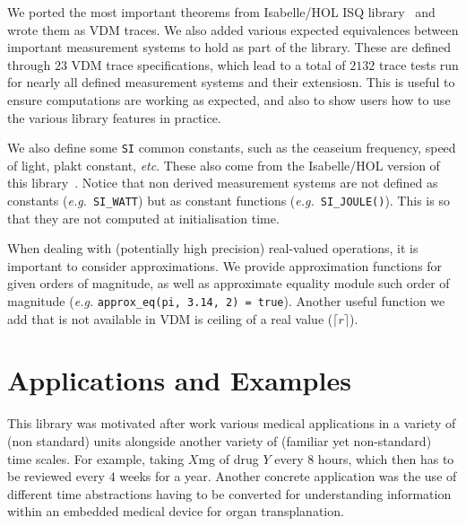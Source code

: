 \documentclass[runningheads,a4paper]{llncs}
\begin{document}
We ported the most important theorems from Isabelle/HOL ISQ library~\cite{Physical_Quantities-AFP} and wrote them as VDM traces. We also added various expected equivalences between important measurement systems to hold as part of the library. These are defined through \(23\) VDM trace specifications, which lead to a total of \(2132\) trace tests run for nearly all defined measurement systems and their extensiosn. This is useful to ensure computations are working as expected, and also to show users how to use the various library features in practice. 

We also define some \texttt{SI} common constants, such as the ceaseium frequency, speed of light, plakt constant, \textit{etc}. These also come from the Isabelle/HOL version of this library~\cite{Physical_Quantities-AFP}. Notice that non derived measurement systems are not defined as constants (\textit{e.g.}~\texttt{SI\_WATT}) but as constant functions (\textit{e.g.}~\texttt{SI\_JOULE()}). This is so that they are not computed at initialisation time.  

When dealing with (potentially high precision) real-valued operations, it is important to consider approximations. We provide approximation functions for given orders of magnitude, as well as approximate equality module such order of magnitude (\textit{e.g.} \texttt{approx\_eq(pi, 3.14, 2) = true}). Another useful function we add that is not available in VDM is ceiling of a real value (\(\lceil r \rceil\)). 

\section{Applications and Examples}\label{sec:Examples}

This library was motivated after work various medical applications in a variety of (non standard) units alongside another variety of (familiar yet non-standard) time scales. For example, taking \(X\)mg of drug \(Y\) every \(8\) hours, which then has to be reviewed every \(4\) weeks for a year. Another concrete application was the use of different time abstractions having to be converted for understanding information within an embedded medical device for organ transplanation.  
\end{document}
